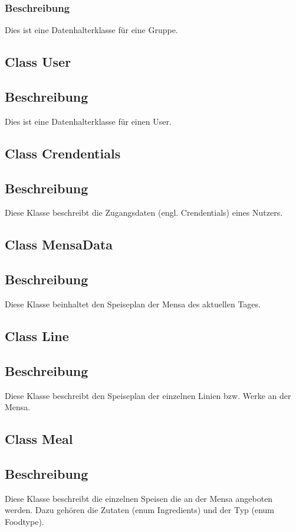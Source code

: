 \documentclass[a4paper]{scrreprt}
\begin{document}
\subsubsection*{Beschreibung}
Dies ist eine Datenhalterklasse für eine Gruppe. 

\subsection{Class User}
\subsection*{Beschreibung}
Dies ist eine Datenhalterklasse für einen User.

\subsection{Class Crendentials}
\subsection*{Beschreibung}
Diese Klasse beschreibt die Zugangsdaten (engl. Crendentials) eines Nutzers.

\subsection{Class MensaData}
\subsection*{Beschreibung}
Diese Klasse beinhaltet den Speiseplan der Mensa des aktuellen Tages.

\subsection{Class Line}
\subsection*{Beschreibung}
Diese Klasse beschreibt den Speiseplan der einzelnen Linien bzw. Werke an der Mensa.

\subsection{Class Meal}
\subsection*{Beschreibung}
Diese Klasse beschreibt die einzelnen Speisen die an der Mensa angeboten werden.
Dazu gehören die Zutaten (enum Ingredients) und der Typ (enum Foodtype).
\end{document}
